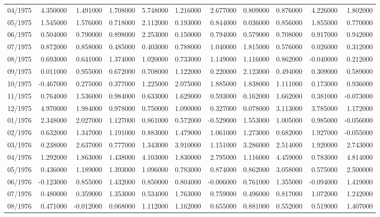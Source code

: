 \begin{tabular}{lrrrrrrrrrr}
04/1975 & 4.350000 & 1.491000 & 1.708000 & 5.748000 & 1.216000 & 2.677000 & 0.809000 & 0.876000 & 4.226000 & 1.802000 \\
05/1975 & 1.545000 & 1.576000 & 0.718000 & 2.112000 & 0.193000 & 0.844000 & 0.036000 & 0.856000 & 1.855000 & 0.770000 \\
06/1975 & 0.504000 & 0.790000 & 0.898000 & 2.253000 & 0.150000 & 0.794000 & 0.579000 & 0.708000 & 0.917000 & 0.942000 \\
07/1975 & 0.872000 & 0.858000 & 0.485000 & 0.403000 & 0.788000 & 1.040000 & 1.815000 & 0.576000 & 0.026000 & 0.312000 \\
08/1975 & 0.693000 & 0.641000 & 1.374000 & 1.020000 & 0.733000 & 1.149000 & 1.116000 & 0.862000 & -0.040000 & 0.212000 \\
09/1975 & 0.011000 & 0.955000 & 0.672000 & 0.708000 & 1.122000 & 0.220000 & 2.123000 & 0.494000 & 0.309000 & 0.589000 \\
10/1975 & -0.467000 & 0.275000 & 0.377000 & 1.225000 & 2.075000 & 1.885000 & 1.838000 & 1.111000 & 0.173000 & 0.936000 \\
11/1975 & 0.764000 & 1.536000 & 0.984000 & 0.633000 & 1.629000 & 0.593000 & 0.162000 & 1.662000 & 0.381000 & -0.073000 \\
12/1975 & 4.970000 & 1.984000 & 0.978000 & 0.750000 & 1.090000 & 0.327000 & 0.078000 & 3.113000 & 3.785000 & 1.172000 \\
01/1976 & 2.348000 & 2.027000 & 1.127000 & 0.861000 & 0.572000 & -0.529000 & 1.553000 & 1.005000 & 0.985000 & -0.056000 \\
02/1976 & 0.632000 & 1.347000 & 1.191000 & 0.883000 & 1.479000 & 1.061000 & 1.273000 & 0.682000 & 1.927000 & -0.055000 \\
03/1976 & 0.238000 & 2.637000 & 0.777000 & 1.343000 & 3.910000 & 1.151000 & 3.286000 & 2.514000 & 1.920000 & 2.743000 \\
04/1976 & 1.292000 & 1.863000 & 1.438000 & 4.103000 & 1.830000 & 2.795000 & 1.116000 & 4.459000 & 0.783000 & 4.814000 \\
05/1976 & 0.436000 & 1.189000 & 1.393000 & 1.096000 & 0.783000 & 0.874000 & 0.862000 & 3.058000 & 0.575000 & 2.500000 \\
06/1976 & -0.123000 & 0.855000 & 1.432000 & 0.850000 & 0.804000 & -0.006000 & 0.761000 & 1.355000 & -0.094000 & 1.419000 \\
07/1976 & 0.480000 & 0.359000 & 1.353000 & 0.534000 & 1.763000 & 0.759000 & 0.496000 & 0.817000 & 1.072000 & 1.242000 \\
08/1976 & 0.471000 & -0.012000 & 0.068000 & 1.112000 & 1.162000 & 0.655000 & 0.881000 & 0.552000 & 0.519000 & 1.407000 \\

\end{tabular}
